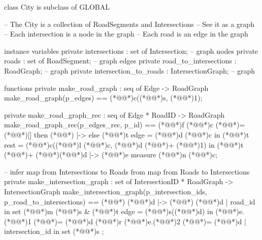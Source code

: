 \documentclass[a4paper]{article}
\begin{document}
\title{}
\author{}
\begin{vdm_al}
class City is subclass of GLOBAL

-- The City is a collection of RoadSegments and Intersections
-- See it as a graph
--      Each intersection is a node in the graph
--      Each road is an edge in the graph

instance variables
    private intersections : set of Intersection; -- graph nodes
    private roads : set of RoadSegment; -- graph edges
    private road_to_intersections : RoadGraph; -- graph
    private intersection_to_roads : IntersectionGraph; -- graph   

functions
    private make_road_graph : seq of Edge -> RoadGraph
    make_road_graph(p_edges) ==
        (*@@*)c((*@@*)s, (*@\vdmnotcovered{}@*)1);

    private make_road_graph_rec : seq of Edge * RoadID -> RoadGraph
    make_road_graph_rec(p_edges_rec, p_id) ==
        (*@@*)f (*@@*)c (*@\vdmnotcovered{}@*)= (*@\vdmnotcovered{}@*)[] then
            (*@\vdmnotcovered{}@*){ |-> }
        else
            (*@@*)t edge = (*@@*)d (*@@*)c in
                (*@@*)t rest = (*@@*)c((*@@*)l (*@@*)c, (*@@*)d (*@\vdmnotcovered{}@*)+ (*@\vdmnotcovered{}@*)1) in
                    (*@@*)t (*@\vdmnotcovered{+}@*)+ (*@\vdmnotcovered{}@*){(*@@*)d |-> (*@@*)e}
    measure (*@@*)n (*@@*)c;

    -- infer map from Intersections to Roads from map from Roads to Intersections
    private make_intersection_graph : set of IntersectionID * RoadGraph -> IntersectionGraph
    make_intersection_graph(p_intersection_ids, p_road_to_intersections) ==
        (*@\vdmnotcovered{}@*){
            (*@@*)d |-> (*@\vdmnotcovered{}@*){
                (*@@*)d
                | road_id in set (*@@*)m (*@@*)s &
                    (*@@*)t edge = (*@@*)s((*@@*)d) in
                        (*@@*)e.(*@@*)1 (*@\vdmnotcovered{}@*)= (*@@*)d (*@@*)r (*@@*)e.(*@@*)2 (*@\vdmnotcovered{}@*)= (*@@*)d
            }
            | intersection_id in set (*@@*)s
        };


\end{vdm_al}
\end{document}
